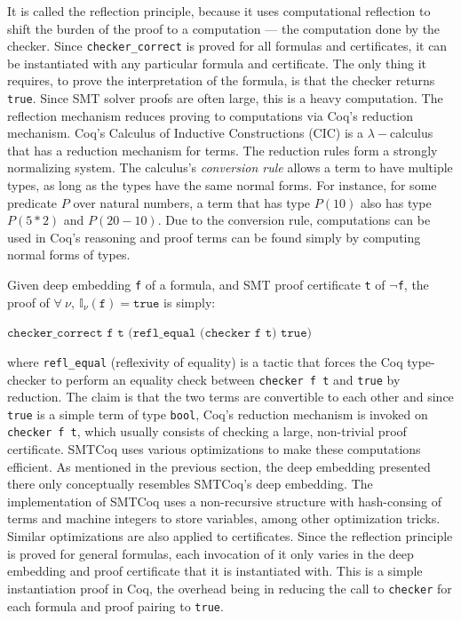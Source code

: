 \documentclass[11pt]{article}
\begin{document}
\begin{enumerate}
		It is called the reflection 
		principle, because it uses 
		computational reflection 
		to shift the burden of the 
		proof to a computation --- 
		the computation done by 
		the checker. Since 
		\texttt{checker\_correct}
		is proved for all formulas 
		and certificates, it can be 
		instantiated with any 
		particular formula and 
		certificate. The only thing it 
		requires, to 
		prove the interpretation of 
		the formula, is that the 
		checker
		returns \texttt{true}.
		Since SMT solver proofs are 
		often large, this is a 
		heavy computation. The
		reflection mechanism reduces
		proving to computations via 
		Coq's reduction mechanism.
		Coq's Calculus of Inductive 
		Constructions (CIC) is a 
		$\lambda-$calculus that has a 
		reduction mechanism for terms. The
		reduction rules form a strongly 
		normalizing system. The calculus's
		\textit{conversion rule} allows a 
		term to have multiple types, as long as 
		the types have the same normal forms. 
		For instance, for some predicate $P$ 
		over natural numbers, a term that 
		has type $P(10)$ also has type 
		$P(5*2)$ and $P(20-10)$. Due 
		to the conversion rule, 
		computations can be used in Coq's 
		reasoning and proof terms can be 
		found simply by computing normal 
		forms of types.
		
		Given 
		deep embedding \texttt{f}
		of a formula, and 
		SMT proof certificate \texttt{t} of 
		\texttt{$\neg$f}, the proof of $\forall\ \nu,\ 
		\mathbb{I}_{\nu}(\texttt{f}) = 
		\texttt{true}$ is simply:
		\begin{center}
			$\texttt{checker\_correct f t
				(refl\_equal (checker f t) true)}$
		\end{center}
		where \texttt{refl\_equal} 
		(reflexivity of equality) is a tactic
		that forces the Coq type-checker to 
		perform an equality check between 
		\texttt{checker f t} and 
		\texttt{true} by reduction. 
		The claim is that the two 
		terms are convertible to each other
		and since \texttt{true} is a simple 
		term of type \texttt{bool}, 
		Coq's reduction mechanism is 
		invoked on \texttt{checker f t},
		which usually consists of checking
		a large, non-trivial proof certificate. 
		SMTCoq uses various optimizations 
		to make these computations efficient.
		As mentioned in the previous section,
		the deep embedding presented there 
		only conceptually resembles SMTCoq's
		deep embedding. The implementation 
		of SMTCoq uses a non-recursive 
		structure with hash-consing of terms
		and machine integers to store variables,
		among other optimization tricks.
		Similar optimizations are also 
		applied to certificates.
		Since the reflection principle is 
		proved for general formulas, 
		each invocation of it only varies
		in the deep embedding and proof 
		certificate that it is instantiated
		with. This is a simple instantiation
		proof in Coq, the overhead
		being in reducing the call to 
		\texttt{checker} for each 
		formula and proof pairing to 
		\texttt{true}.
\end{enumerate}
	
\end{document}
